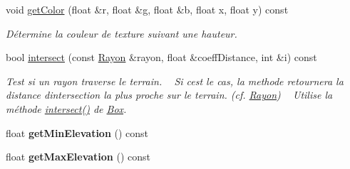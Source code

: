 \begin{DoxyCompactItemize}
void \hyperlink{class_terrain_a0a1bdaf1c083c94f8abb0cf28c14ae94}{get\+Color} (float \&r, float \&g, float \&b, float x, float y) const 
\begin{DoxyCompactList}\small\item\em Détermine la couleur de texture suivant une hauteur. \end{DoxyCompactList}\item 
bool \hyperlink{class_terrain_a732fa3071315926ba8f65f2fdf3acd23}{intersect} (const \hyperlink{class_rayon}{Rayon} \&rayon, float \&coeff\+Distance, int \&i) const 
\begin{DoxyCompactList}\small\item\em Test si un rayon traverse le terrain. ~\newline
Si c\textquotesingle{}est le cas, la methode retournera la distance d\textquotesingle{}intersection la plus proche sur le terrain. (cf. \hyperlink{class_rayon}{Rayon}) ~\newline
Utilise la méthode \hyperlink{class_terrain_a732fa3071315926ba8f65f2fdf3acd23}{intersect()} de \hyperlink{class_box}{Box}. \end{DoxyCompactList}\item 
\hypertarget{class_terrain_a50ed0e99f87cf87404c32c437cc6e20f}{}float {\bfseries get\+Min\+Elevation} () const \label{class_terrain_a50ed0e99f87cf87404c32c437cc6e20f}

\item 
\hypertarget{class_terrain_af50861f0e70b46e4bead8714f9e00c03}{}float {\bfseries get\+Max\+Elevation} () const \label{class_terrain_af50861f0e70b46e4bead8714f9e00c03}


\end{DoxyCompactItemize}
